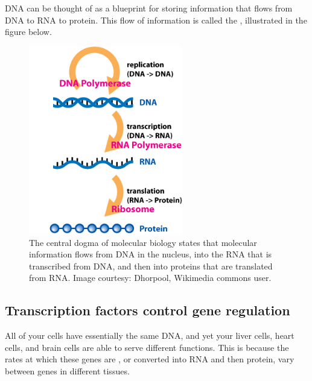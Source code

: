 DNA can be thought of as a blueprint for storing information that flows from DNA to RNA to protein. This flow of information is called the , illustrated in the figure below.

\begin{note}\end{note}

\begin{figure}[h]
\centering
\mySfFamily
\includegraphics[width = 0.6\textwidth]{../images/Central_Dogma_of_Molecular_Biochemistry_with_Enzymes.jpg}
\caption{The central dogma of molecular biology states that molecular information flows from DNA in the nucleus, into the RNA that is transcribed from DNA, and then into proteins that are translated from RNA. Image courtesy: Dhorpool, Wikimedia commons user.}
\label{fig:Central_Dogma_of_Molecular_Biochemistry_with_Enzymes}
\end{figure}

\FloatBarrier
{}
\subsection{Transcription factors control gene regulation}

All of your cells have essentially the same DNA, and yet your liver cells, heart cells, and brain cells are able to serve different functions. This is because the rates at which these genes are , or converted into RNA and then protein, vary between genes in different tissues.


